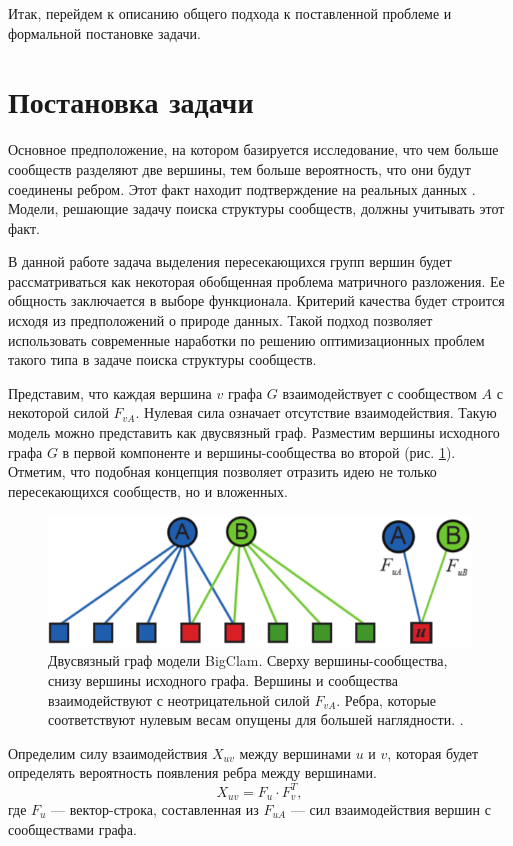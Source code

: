 \documentclass{ITaSconf}
\begin{document}
Итак, перейдем к описанию общего подхода к поставленной проблеме и формальной постановке задачи.

\section{Постановка задачи}

Основное предположение, на котором базируется исследование, что чем больше сообществ разделяют две вершины, тем больше вероятность, что они будут соединены ребром. Этот факт находит подтверждение на реальных данных \cite{yang2013overlapping}. Модели, решающие задачу поиска структуры сообществ, должны учитывать этот факт.

В данной работе задача выделения пересекающихся групп вершин будет рассматриваться как некоторая обобщенная проблема матричного разложения. Ее общность заключается в выборе функционала. Критерий качества будет строится исходя из предположений о природе данных. Такой подход позволяет использовать современные наработки по решению оптимизационных проблем такого типа в задаче поиска структуры сообществ.

Представим, что каждая вершина $v$  графа $G$ взаимодействует с сообществом $A$ с некоторой силой $F_{vA}$. Нулевая сила означает отсутствие взаимодействия. Такую модель можно представить как двусвязный граф. Разместим вершины исходного графа $G$ в первой компоненте и вершины-сообщества во второй (рис. \ref{fig:AGM}). Отметим, что подобная концепция позволяет отразить идею не только пересекающихся сообществ, но и вложенных.
\begin{figure}[!ht]
	\centering
	\includegraphics[width=\linewidth]{imgs/BigCLAM_model.png}
	\caption{Двусвязный граф модели BigClam. Сверху вершины-сообщества, снизу вершины исходного графа. Вершины и сообщества взаимодействуют с неотрицательной силой $F_{vA}$. Ребра, которые соответствуют нулевым весам опущены для большей наглядности. \cite{yang2013overlapping}.}
	\label{fig:AGM}
\end{figure}
Определим силу взаимодействия $X_{uv}$ между вершинами $u$ и $v$, которая будет определять вероятность появления ребра между вершинами.
$$X_{uv} = F_{u} \cdot F_{v}^T,$$
где $F_{u}$ --- вектор-строка, составленная из $F_{uA}$ --- сил взаимодействия вершин с сообществами графа.
\end{document}
